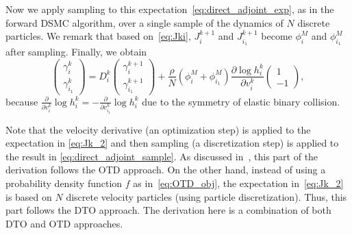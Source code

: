 \documentclass[12pt,nopreprintline]{elsarticle}
\begin{document}
Now we apply sampling to this expectation~\eqref{eq:direct_adjoint_exp}, as in the forward DSMC algorithm, over a single sample of the dynamics of $N$ discrete particles. We remark that based on~\eqref{eq:Jki}, $J_{i}^{k+1}$ and $J_{i_1}^{k+1}$ become $\phi_{i}^{M}$ and $\phi_{i_1}^{M}$ after sampling. Finally, we obtain 
\begin{equation}\label{eq:direct_adjoint_sample}
    \begin{pmatrix}
    \gamma_i^k\\
    \gamma_{i_1}^k
    \end{pmatrix}
     =  D_i^k  \begin{pmatrix}
    \gamma_i^{k+1}\\
    \gamma_{i_1}^{k+1}
    \end{pmatrix}   +  \frac{\rho}{N} \left( \phi_{i}^{M} + \phi_{i_1}^{M} \right)  \frac{\partial \log h_i^k }{\partial v_i^k}\begin{pmatrix}
    1\\
    -1
    \end{pmatrix},
\end{equation}
because $  \frac{\partial }{\partial v_i^k} \log h_i^k  = - \frac{\partial }{\partial v_{i_1}^k} \log h_{i}^k $ due to the symmetry of elastic binary collision. 

Note that the velocity derivative (an optimization step) is applied to the expectation in \eqref{eq:Jk_2} and then sampling (a discretization step) is applied to the result in \eqref{eq:direct_adjoint_sample}. As discussed in~, this part of the derivation follows the OTD approach. On the other hand, instead of using a probability density function $f$ as in~\eqref{eq:OTD_obj}, the expectation in~\eqref{eq:Jk_2} is based on $N$ discrete velocity particles (using particle discretization). Thus, this part follows the DTO approach. The derivation here is a combination of both DTO and OTD approaches.
\end{document}
